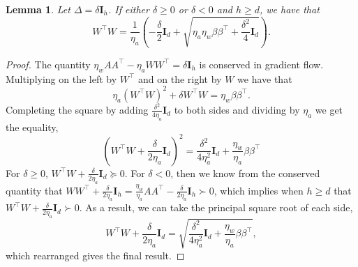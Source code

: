 \documentclass{article}
\theoremstyle{plain}
\newtheorem{lemma}[theorem]{Lemma}
\theoremstyle{definition}
\theoremstyle{remark}
\begin{document}
\begin{lemma}
    \label{lemma:WW_in_terms_Beta_wide}
    Let $\Delta = \delta \mathbf{I}_h$. If either $\delta \geq 0$ or $\delta < 0$ and $h \geq d$, we have that
    \begin{equation}
        W^{\intercal}W = \frac{1}{\eta_a}  \left ( - \frac{\delta}{2}\mathbf{I}_d + \sqrt{\eta_a \eta_w \beta \beta^{\intercal}  + \frac{\delta^2}{4}\mathbf{I}_d} \right).
    \end{equation}
\end{lemma}
\begin{proof} 
The quantity $ \eta_wAA^\intercal - \eta_aWW^\intercal= \delta \mathbf{I}_h$ is conserved in gradient flow. 
%
Multiplying on the left by $W^\intercal$ and on the right by $W$ we have that
\begin{equation}
\eta_a ( W^{\intercal}W)^2 +\delta W^{\intercal}W = \eta_w \beta \beta^{\intercal}.
\end{equation}
Completing the square by adding $\frac{\delta^2}{4\eta_a}\mathbf{I}_d$ to both sides and dividing by $\eta_a$ we get the equality,
\begin{equation}
\left( W^{\intercal}W + \frac{\delta}{2\eta_a}\mathbf{I}_d \right)^2 = \frac{\delta^2}{4\eta_a^2}\mathbf{I}_d + \frac{\eta_w}{\eta_a}\beta\beta^\intercal
\end{equation}
For $\delta \geq 0$, $W^{\intercal}W + \frac{\delta}{2\eta_a}\mathbf{I}_d \succeq 0$. 
%
For $\delta < 0$, then we know from the conserved quantity that $WW^\intercal + \frac{\delta}{2\eta_a}\mathbf{I}_h = \frac{\eta_w}{\eta_a}AA^\intercal - \frac{\delta}{2 \eta_a}\mathbf{I}_h \succ 0$, which implies when $h \ge d$ that $W^{\intercal}W + \frac{\delta}{2\eta_a}\mathbf{I}_d \succ 0$.
%
As a result, we can take the principal square root of each side,
\begin{equation}
    W^{\intercal}W + \frac{\delta}{2\eta_a}\mathbf{I}_d = \sqrt{\frac{\delta^2}{4\eta_a^2}\mathbf{I}_d + \frac{\eta_w}{\eta_a}\beta\beta^\intercal},
\end{equation}
which rearranged gives the final result.
\end{proof}
\end{document}
